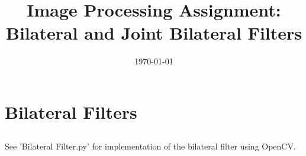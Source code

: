 \documentclass{article}
\begin{document}
	\title{Image Processing Assignment: Bilateral and Joint Bilateral Filters}
	\date{\printdayoff\today}
	\maketitle
	\section{Bilateral Filters}
	\subsection{}
	
	\subsection{}
	See 'Bilateral Filter.py' for implementation of the bilateral filter using OpenCV.
	
	\subsection{}	
\end{document}
